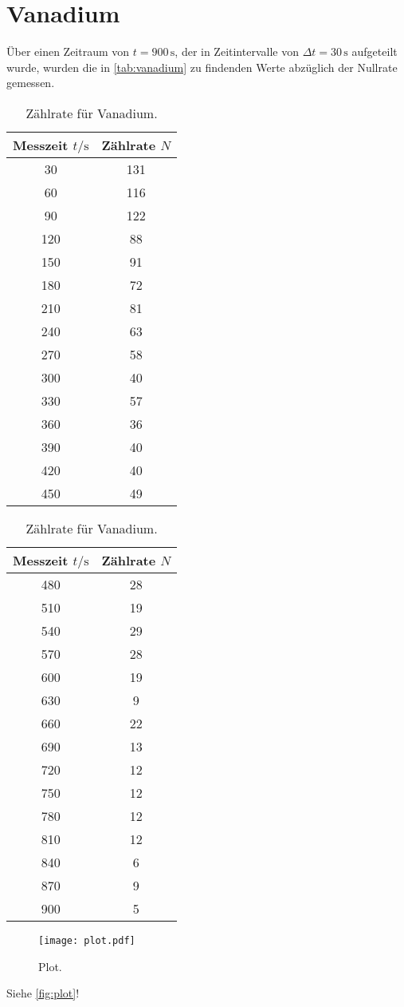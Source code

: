 \section{Vanadium}
\label{sec:Vanadium}
Über einen Zeitraum von $t=900\,\unit{\second}$, der in Zeitintervalle von $\Delta t = 30\,\unit{\second}$
aufgeteilt wurde, wurden die in \autoref{tab:vanadium} zu findenden Werte abzüglich der Nullrate gemessen.
\begin{table}
  \centering
  \begin{tabular}{c c}
    \toprule
    Messzeit $t/\unit{\second}$ & Zählrate $N$\\
    \midrule
     30 & 131 \\
     60 & 116 \\
     90 & 122 \\
    120 &  88 \\
    150 &  91 \\
    180 &  72 \\
    210 &  81 \\
    240 &  63 \\
    270 &  58 \\
    300 &  40 \\
    330 &  57 \\
    360 &  36 \\
    390 &  40 \\
    420 &  40 \\
    450 &  49 \\
    \bottomrule
  \end{tabular}
  \begin{tabular}{c c}
    \toprule
    Messzeit $t/\unit{\second}$ & Zählrate $N$\\
    \midrule
    480 &  28 \\
    510 &  19 \\
    540 &  29 \\
    570 &  28 \\
    600 &  19 \\
    630 &   9 \\
    660 &  22 \\
    690 &  13 \\
    720 &  12 \\
    750 &  12 \\
    780 &  12 \\
    810 &  12 \\
    840 &   6 \\
    870 &   9 \\
    900 &   5 \\
    \bottomrule
  \end{tabular}
  \caption{Zählrate für Vanadium.}
  \label{tab:vanadium}
\end{table}

\begin{figure}
  \centering
  \texttt{[image: plot.pdf]}
  \caption{Plot.}
  \label{fig:plot}
\end{figure}


Siehe \autoref{fig:plot}!
